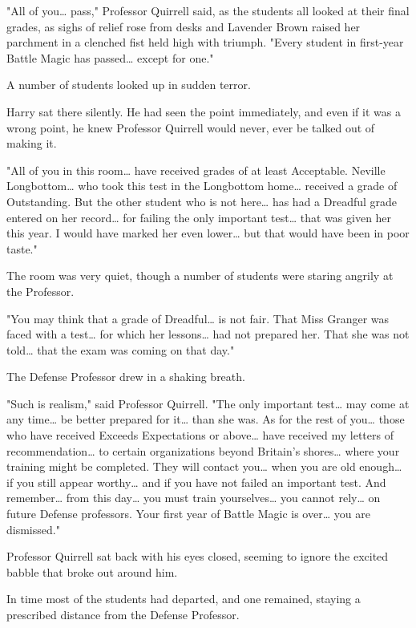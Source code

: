 "All of you{\ldots} pass," Professor Quirrell said, as the students all looked at their final grades, as sighs of relief rose from desks and Lavender Brown raised her parchment in a clenched fist held high with triumph. "Every student in first-year Battle Magic has passed{\ldots} except for one."

A number of students looked up in sudden terror.

Harry sat there silently. He had seen the point immediately, and even if it was a wrong point, he knew Professor Quirrell would never, ever be talked out of making it.

"All of you in this room{\ldots} have received grades of at least Acceptable. Neville Longbottom{\ldots} who took this test in the Longbottom home{\ldots} received a grade of Outstanding. But the other student who is not here{\ldots} has had a Dreadful grade entered on her record{\ldots} for failing the only important test{\ldots} that was given her this year. I would have marked her even lower{\ldots} but that would have been in poor taste."

The room was very quiet, though a number of students were staring angrily at the Professor.

"You may think that a grade of Dreadful{\ldots} is not fair. That Miss Granger was faced with a test{\ldots} for which her lessons{\ldots} had not prepared her. That she was not told{\ldots} that the exam was coming on that day."

The Defense Professor drew in a shaking breath.

"Such is realism," said Professor Quirrell. "The only important test{\ldots} may come at any time{\ldots} be better prepared for it{\ldots} than she was. As for the rest of you{\ldots} those who have received Exceeds Expectations or above{\ldots} have received my letters of recommendation{\ldots} to certain organizations beyond Britain's shores{\ldots} where your training might be completed. They will contact you{\ldots} when you are old enough{\ldots} if you still appear worthy{\ldots} and if you have not failed an important test. And remember{\ldots} from this day{\ldots} you must train yourselves{\ldots} you cannot rely{\ldots} on future Defense professors. Your first year of Battle Magic is over{\ldots} you are dismissed."

Professor Quirrell sat back with his eyes closed, seeming to ignore the excited babble that broke out around him.

In time most of the students had departed, and one remained, staying a prescribed distance from the Defense Professor.

